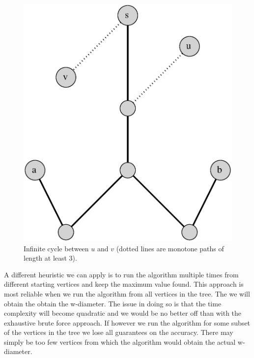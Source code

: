 \begin{figure}[h]%
    \centering
    \includegraphics[center, scale=0.3]{./images/2xbfs-path-case-3.eps}
    \caption{Infinite cycle between $u$ and $v$ (dotted lines are monotone paths of length at least 3). }%
    \label{fig:case3}%
\end{figure}


A different heuristic we can apply is to run the algorithm multiple times from different starting vertices and keep the maximum value found. This approach is most reliable when we run the algorithm from all vertices in the tree. The we will obtain the obtain the w-diameter. The issue in doing so is that the time complexity will become quadratic and we would be no better off than with the exhaustive brute force approach. If however we run the algorithm for some subset of the vertices in the tree we lose all guarantees on the accuracy. There may simply be too few vertices from which the algorithm would obtain the actual w-diameter.




